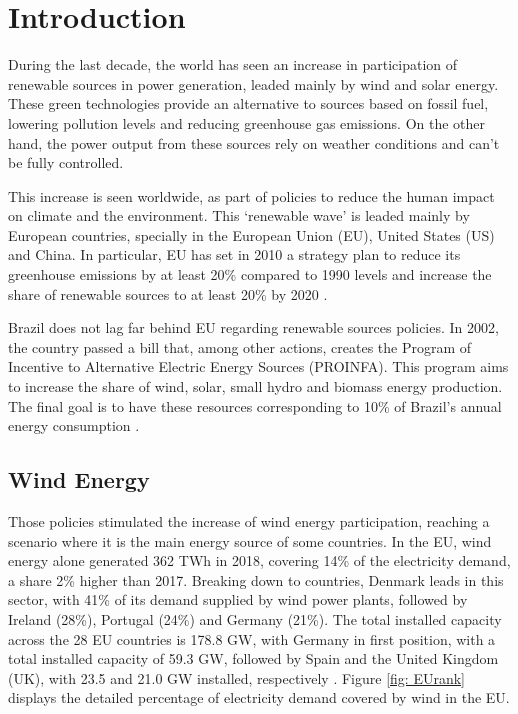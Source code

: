 
\chapter[Introduction]{Introduction}
\label{ch: Intro}

During the last decade, the world has seen an increase in participation of renewable sources in power generation, leaded mainly by wind and solar energy. These green technologies provide an alternative to sources based on fossil fuel, lowering pollution levels and reducing greenhouse gas emissions. On the other hand, the power output from these sources rely on weather conditions and can't be fully controlled.

This increase is seen worldwide, as part of policies to reduce the human impact on climate and the environment. This `renewable wave' is leaded mainly by European countries, specially in the European Union (EU), United States (US) and China. In particular, EU has set in 2010 a strategy plan to reduce its greenhouse emissions by at least 20\% compared to 1990 levels and increase the share of renewable sources to at least 20\% by 2020 \cite{Europe2020}.

Brazil does not lag far behind EU regarding renewable sources policies. In 2002, the country passed a bill that, among other actions, creates the Program of Incentive to Alternative Electric Energy Sources (PROINFA). This program aims to increase the share of wind, solar, small hydro and biomass energy production. The final goal is to have these resources corresponding to 10\% of Brazil's annual energy consumption \cite{Brazil2002}.

\section{Wind Energy}

Those policies stimulated the increase of wind energy participation, reaching a scenario where it is the main energy source of some countries. In the EU, wind energy alone generated 362 TWh in 2018, covering 14\% of the electricity demand, a share 2\% higher than 2017. Breaking down to countries, Denmark leads in this sector, with 41\% of its demand supplied by wind power plants, followed by Ireland (28\%), Portugal (24\%) and Germany (21\%). The total installed capacity across the 28 EU countries is 178.8 GW, with Germany in first position, with a total installed capacity of 59.3 GW, followed by Spain and the United Kingdom (UK), with 23.5 and 21.0 GW installed, respectively \cite{WindEurope2019}. Figure \ref{fig: EUrank} displays the detailed percentage of electricity demand covered by wind in the EU.

